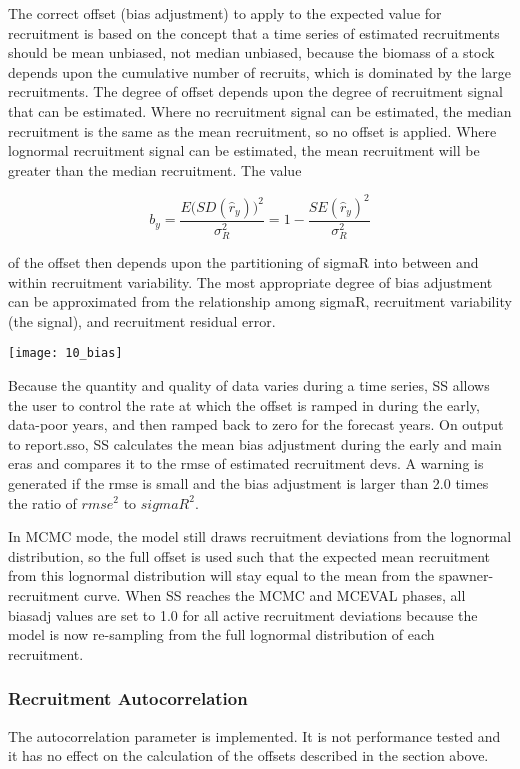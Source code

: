 The correct offset (bias adjustment) to apply to the expected value for recruitment is based on the concept that a time series of estimated recruitments should be mean unbiased, not median unbiased, because the biomass of a stock depends upon the cumulative number of recruits, which is dominated by the large recruitments.  The degree of offset depends upon the degree of recruitment signal that can be estimated.  Where no recruitment signal can be estimated, the median recruitment is the same as the mean recruitment, so no offset is applied.  Where lognormal recruitment signal can be estimated, the mean recruitment will be greater than the median recruitment.  The value

\begin{equation}
	b_y=\frac{E\Big( SD(\hat{r}_y)\Big)^2}{\sigma^2_R}=1-\frac{SE(\hat{r}_y)^2}{\sigma^2_R}
\end{equation}

\noindent of the offset then depends upon the partitioning of sigmaR into between and within recruitment variability.  The most appropriate degree of bias adjustment can be approximated from the relationship among sigmaR, recruitment variability (the signal), and recruitment residual error.

\begin{center}
	\texttt{[image: 10\_bias]}
\end{center}

Because the quantity and quality of data varies during a time series, SS allows the user to control the rate at which the offset is ramped in during the early, data-poor years, and then ramped back to zero for the forecast years.
On output to report.sso, SS calculates the mean bias adjustment during the early and main eras and compares it to the rmse of estimated recruitment devs.  A warning is generated if the rmse is small and the bias adjustment is larger than 2.0 times the ratio of $rmse^2$ to $sigmaR^2$.

In MCMC mode, the model still draws recruitment deviations from the lognormal distribution, so the full offset is used such that the expected mean recruitment from this lognormal distribution will stay equal to the mean from the spawner-recruitment curve. When SS reaches the MCMC and MCEVAL phases, all biasadj values are set to 1.0 for all active recruitment deviations because the model is now re-sampling from the full lognormal distribution of each recruitment.

\subsubsection{Recruitment Autocorrelation}
The autocorrelation parameter is implemented.  It is not performance tested and it has no effect on the calculation of the offsets described in the section above.

